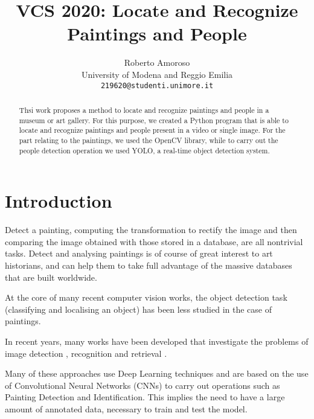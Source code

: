 \documentclass[10pt,twocolumn,letterpaper]{article}
\begin{document}
\title{VCS 2020: Locate and Recognize Paintings and People}

\author{Roberto Amoroso\\
University of Modena and Reggio Emilia\\
{\tt\small 219620@studenti.unimore.it}
}

\maketitle

\begin{abstract}
   Thsi work proposes a method to locate and recognize paintings and people in a museum or art gallery. For this purpose, we created a Python program that is able to locate and recognize paintings and people present in a video or single image. For the part relating to the paintings, we used the OpenCV library, while to carry out the people detection operation we used YOLO, a real-time object detection system.
\end{abstract}

\section{Introduction}
Detect a painting, computing the transformation to rectify the image and then comparing the image obtained with those stored in a database, are all nontrivial tasks. Detect and analysing paintings is of course of great interest to art historians, and can help them to take full advantage of the massive databases that are built worldwide.

At the core of many recent computer vision works, the object detection task (classifying and localising an object) has
been less studied in the case of paintings.

In recent years, many works have been developed that investigate the problems of image detection \cite{fathy1995image,hambly2001supercosmos}, recognition \cite{martinel2013robust} and retrieval \cite{rui1999image}. 

Many of these approaches use Deep Learning techniques and are based on the use of Convolutional Neural Networks (CNNs) to carry out operations such as Painting Detection and Identification\cite{hong2019art}. This implies the need to have a large amount of annotated data, necessary to train and test the model.
\end{document}
